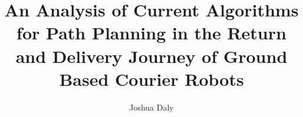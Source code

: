 \documentclass[12pt]{report}
\newlength{\defbaselineskip}
\newcommand{\setlinespacing}[1]%
           {\setlength{\baselineskip}{#1 \defbaselineskip}}
\begin{document}
\setlinespacing{1.5}

\title{An Analysis of Current Algorithms for Path Planning in the Return and Delivery Journey of Ground Based Courier Robots}

\author{Joshua Daly}



\address{Dublin, Ireland}


\submitdate{\today}



\beforepreface

{ 
}

%

\afterpreface

\pagestyle{fancy}
\setcounter{page}{1}








%



%
\end{document}
